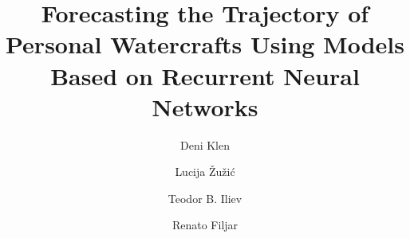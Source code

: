 \documentclass[preprint,12pt]{elsarticle}
\begin{document}
\begin{frontmatter}
\title{Forecasting the Trajectory of Personal Watercrafts Using Models Based on Recurrent Neural Networks} %
\author[1,2]{Deni Klen}
\author[1,2]{Lucija \v{Z}u\v{z}i\'{c}}
\author[3]{Teodor B. Iliev}%
\author[1,2,4]{Renato Filjar}%
 

\end{frontmatter}
\end{document}
